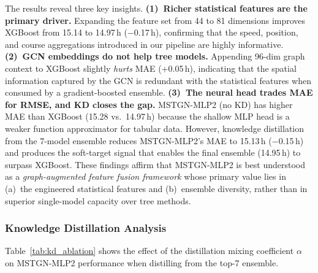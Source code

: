 \documentclass[conference]{IEEEtran}
\begin{document}
The results reveal three key insights.
\textbf{(1)~Richer statistical features are the primary driver.}
Expanding the feature set from 44 to 81 dimensions improves XGBoost from 15.14 to 14.97\,h ($-$0.17\,h), confirming that the speed, position, and course aggregations introduced in our pipeline are highly informative.
\textbf{(2)~GCN embeddings do not help tree models.}
Appending 96-dim graph context to XGBoost slightly \emph{hurts} MAE (+0.05\,h), indicating that the spatial information captured by the GCN is redundant with the statistical features when consumed by a gradient-boosted ensemble.
\textbf{(3)~The neural head trades MAE for RMSE, and KD closes the gap.}
MSTGN-MLP2 (no KD) has higher MAE than XGBoost (15.28 vs.\ 14.97\,h) because the shallow MLP head is a weaker function approximator for tabular data.
However, knowledge distillation from the 7-model ensemble reduces MSTGN-MLP2's MAE to 15.13\,h ($-$0.15\,h) and produces the soft-target signal that enables the final ensemble (14.95\,h) to surpass XGBoost.
These findings affirm that MSTGN-MLP2 is best understood as a \emph{graph-augmented feature fusion framework} whose primary value lies in (a)~the engineered statistical features and (b)~ensemble diversity, rather than in superior single-model capacity over tree methods.


\subsubsection{Knowledge Distillation Analysis}
\label{sec:kd_ablation}

Table~\ref{tab:kd_ablation} shows the effect of the distillation mixing coefficient $\alpha$ on MSTGN-MLP2 performance when distilling from the top-7 ensemble.
\end{document}
